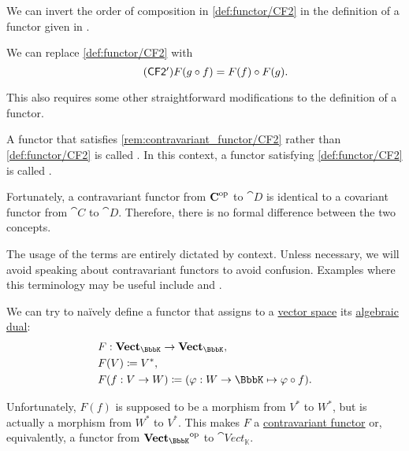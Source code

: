 \begin{remark}\label{rem:contravariant_functor}
  We can invert the order of composition in \ref{def:functor/CF2} in the definition of a functor given in .
  \begin{thmenum}
     We can replace \ref{def:functor/CF2} with
    \begin{equation}\label{eq:rem:contravariant_functor/CF2}\tag{\logic{CF2\Textprime}}
      F(g \bincirc f) = F(f) \bincirc F(g).
    \end{equation}
  \end{thmenum}

  This also requires some other straightforward modifications to the definition of a functor.

  A functor that satisfies \ref{rem:contravariant_functor/CF2} rather than \ref{def:functor/CF2} is called . In this context, a functor satisfying \ref{def:functor/CF2} is called .

  Fortunately, a contravariant functor from \( \operatorname{\mathbf{C}}^{\operatorname{op}} \) to \( \cat{D} \) is identical to a covariant functor from \( \cat{C} \) to \( \cat{D} \). Therefore, there is no formal difference between the two concepts.

  The usage of the terms are entirely dictated by context. Unless necessary, we will avoid speaking about contravariant functors to avoid confusion. Examples where this terminology may be useful include  and .
\end{remark}

\begin{example}\label{ex:dual_space_contravariant_functor}
  We can try to na\"ively define a functor that assigns to a \hyperref[def:vector_space]{vector space} its \hyperref[def:dual_vector_space]{algebraic dual}:
  \begin{equation*}
    \begin{aligned}
      &F: \cat{Vect_\BbbK} \to \cat{Vect_\BbbK}, \\
      &F(V) \coloneqq V^*, \\
      &F(f: V \to W) \coloneqq (\varphi: W \to \BbbK \mapsto \varphi \bincirc f).
    \end{aligned}
  \end{equation*}

  Unfortunately, \( F(f) \) is supposed to be a morphism from \( V^* \) to \( W^* \), but is actually a morphism from \( W^* \) to \( V^* \). This makes \( F \) a \hyperref[rem:contravariant_functor]{contravariant functor} or, equivalently, a functor from \( \cat{Vect_\BbbK}^{\opcat} \) to \( \cat{Vect_\BbbK} \).
\end{example}

